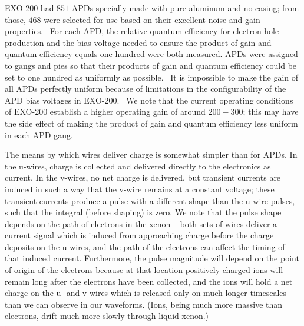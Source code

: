 EXO-200 had $851$ APDs specially made with pure aluminum and no casing; from those, $468$ were selected for use based on their excellent noise and gain properties.~\cite{EXOLAAPD}  For each APD, the relative quantum efficiency for electron-hole production and the bias voltage needed to ensure the product of gain and quantum efficiency equals one hundred were both measured.  APDs were assigned to gangs and pies so that their products of gain and quantum efficiency could be set to one hundred as uniformly as possible.~\cite{APDMeasurementAndGanging}  It is impossible to make the gain of all APDs perfectly uniform because of limitations in the configurability of the APD bias voltages in EXO-200.~\cite{detectorPartI}  We note that the current operating conditions of EXO-200 establish a higher operating gain of around $200-300$; this may have the side effect of making the product of gain and quantum efficiency less uniform in each APD gang.

The means by which wires deliver charge is somewhat simpler than for APDs.  In the u-wires, charge is collected and delivered directly to the electronics as current.  In the v-wires, no net charge is delivered, but transient currents are induced in such a way that the v-wire remains at a constant voltage; these transient currents produce a pulse with a different shape than the u-wire pulses, such that the integral (before shaping) is zero.  We note that the pulse shape depends on the path of electrons in the xenon -- both sets of wires deliver a current signal which is induced from approaching charge before the charge deposits on the u-wires, and the path of the electrons can affect the timing of that induced current.  Furthermore, the pulse magnitude will depend on the point of origin of the electrons because at that location positively-charged ions will remain long after the electrons have been collected, and the ions will hold a net charge on the u- and v-wires which is released only on much longer timescales than we can observe in our waveforms.  (Ions, being much more massive than electrons, drift much more slowly through liquid xenon.)~\cite{EnergyDocumentRun2a}~\cite{MCDocumentRun2a}

